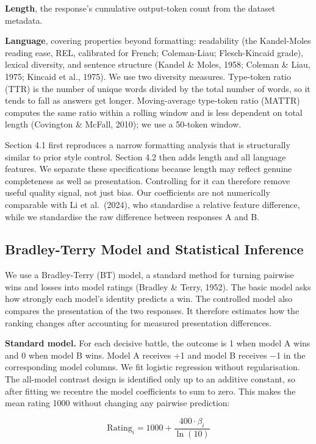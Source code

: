 \documentclass[
]{article}
\begin{document}
\textbf{Length}, the response's cumulative output-token count from the
dataset metadata.

\textbf{Language}, covering properties beyond formatting: readability
(the Kandel-Moles reading ease, REL, calibrated for French; Coleman-Liau; Flesch-Kincaid
grade), lexical diversity, and sentence structure (Kandel \& Moles,
1958; Coleman \& Liau, 1975; Kincaid et al., 1975). We use two diversity
measures. Type-token ratio (TTR) is the number of unique words divided
by the total number of words, so it tends to fall as answers get longer.
Moving-average type-token ratio (MATTR) computes the same ratio within
a rolling window and is less dependent on total length (Covington \&
McFall, 2010); we use a 50-token window.

Section 4.1 first reproduces a narrow formatting analysis that is
structurally similar to prior style control. Section 4.2 then adds
length and all language features. We separate these specifications
because length may reflect genuine completeness as well as presentation.
Controlling for it can therefore remove useful quality signal, not just
bias. Our coefficients are not numerically comparable with Li et
al.~(2024), who standardise a relative feature difference, while we
standardise the raw difference between responses A and B.

\subsection{Bradley-Terry Model and Statistical Inference}\label{bradley-terry-model}

We use a Bradley-Terry (BT) model, a standard method for turning
pairwise wins and losses into model ratings (Bradley \& Terry, 1952).
The basic model asks how strongly each model's identity predicts a win.
The controlled model also compares the presentation of the two
responses. It therefore estimates how the ranking changes after
accounting for measured presentation differences.

\textbf{Standard model.} For each decisive battle, the outcome is 1 when
model A wins and 0 when model B wins. Model A receives +1 and model B
receives −1 in the corresponding model columns. We fit logistic
regression without regularisation. The all-model contrast design is
identified only up to an additive constant, so after fitting we recentre
the model coefficients to sum to zero. This makes the mean rating 1000
without changing any pairwise prediction:

\[\text{Rating}_i = 1000 + \frac{400 \cdot \beta_i}{\ln(10)}\]
\end{document}

